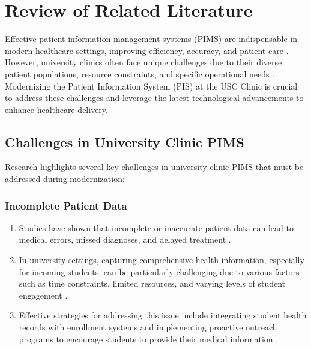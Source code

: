 
\chapter{Review of Related Literature}

\ifpdf
    \graphicspath{{Chapter2/Figs/Raster/}{Chapter2/Figs/PDF/}{Chapter2/Figs/}}
\else
    \graphicspath{{Chapter2/Figs/Vector/}{Chapter2/Figs/}}
\fi

Effective patient information management systems (PIMS) are indispensable in modern healthcare settings, improving efficiency, accuracy, and patient care \cite{who2010}. However, university clinics often face unique challenges due to their diverse patient populations, resource constraints, and specific operational needs \cite{nagel2022}. Modernizing the Patient Information System (PIS) at the USC Clinic is crucial to address these challenges and leverage the latest technological advancements to enhance healthcare delivery.

\section{Challenges in University Clinic PIMS}

Research highlights several key challenges in university clinic PIMS that must be addressed during modernization:

\subsection{Incomplete Patient Data}
\begin{enumerate}
    \item Studies have shown that incomplete or inaccurate patient data can lead to medical errors, missed diagnoses, and delayed treatment \cite{chowdhury2022}.
    \item In university settings, capturing comprehensive health information, especially for incoming students, can be particularly challenging due to various factors such as time constraints, limited resources, and varying levels of student engagement \cite{donnelly2022}.
    \item Effective strategies for addressing this issue include integrating student health records with enrollment systems and implementing proactive outreach programs to encourage students to provide their medical information \cite{donnelly2022, wurster2024}.
\end{enumerate}

